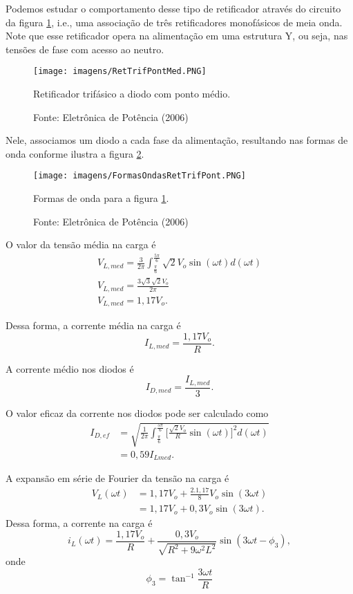 Podemos estudar o comportamento desse tipo de retificador através do circuito da figura \ref{fig:RTDPM}, i.e., uma associação de três retificadores monofásicos de meia onda.  Note que esse retificador opera na alimentação em uma estrutura Y, ou seja, nas tensões de fase com acesso ao neutro.

\begin{figure}[ht]
    \center
    \texttt{[image: imagens/RetTrifPontMed.PNG]}
    \caption{Retificador trifásico a diodo com ponto médio.}\label{fig:RTDPM}
    \caption*{Fonte: Eletrônica de Potência (2006)}
\end{figure}

Nele, associamos um diodo a cada fase da alimentação, resultando nas formas de onda conforme ilustra a figura \ref{fig:FRTDPM}.

\begin{figure}[ht]
    \center
    \texttt{[image: imagens/FormasOndasRetTrifPont.PNG]}
    \caption{Formas de onda para a figura \ref{fig:RTDPM}.}\label{fig:FRTDPM}
    \caption*{Fonte: Eletrônica de Potência (2006)}
\end{figure}

O valor da tensão média na carga é
\begin{align*}
V_{L,med} = \frac{3}{2\pi}{\int_{\frac{\pi}{6}}^{\frac{5\pi}{6}}}{\sqrt{2}{V_o}{\sin(\omega{t})}{d(\omega{t})}} \\
V_{L,med} = \frac{3{\sqrt{3}{\sqrt{2}}{V_o}}}{2\pi} \\
V_{L,med} = 1,17 V_o
.\end{align*}

Dessa forma, a corrente média na carga é \[
I_{L,med} = \frac{1,17 V_o}{R}
.\] 

A corrente médio nos diodos é \[
I_{D,med} = \frac{I_{L,med}}{3}
.\] 

O valor eficaz da corrente nos diodos pode ser calculado como
\begin{align*}
    I_{D,ef} &= \sqrt{\frac{1}{2\pi}{\int_{\frac{\pi}{6}}^{\frac{5\pi}{6}}}{[{\frac{\sqrt{2}{V_o}}{R}}{\sin(\omega{t})}}]^2{d(\omega{t})}} \\
	     &= 0,59{I_{Lmed}}
.\end{align*}

A expansão em série de Fourier da tensão na carga é
\begin{align*}
    V_{L}{(\omega{t})} &= 1,17{V_o} + \frac{2.1,17}{8}{V_o}{\sin(3\omega{t})} \\
    &= 1,17 V_o + 0,3V_o{\sin(3\omega{t})}
.\end{align*}
Dessa forma, a corrente na carga é \[
i_L(\omega{t}) = \frac{1,17 V_o}{R} + \frac{0,3 V_o}{\sqrt{R^2 + {9\omega^2}{L^2}}}{\sin(3\omega{t} - \phi_3)}
,\] onde \[{\phi_3} = \tan^{-1}{\frac{3\omega{t}}{R}}\]

